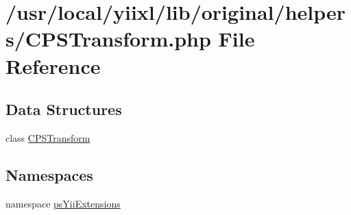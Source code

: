 \hypertarget{CPSTransform_8php}{
\section{/usr/local/yiixl/lib/original/helpers/CPSTransform.php File Reference}
\label{CPSTransform_8php}
}
\subsection*{Data Structures}
\begin{DoxyCompactItemize}
\item 
class \hyperlink{classCPSTransform}{CPSTransform}
\end{DoxyCompactItemize}
\subsection*{Namespaces}
\begin{DoxyCompactItemize}
\item 
namespace \hyperlink{namespacepsYiiExtensions}{psYiiExtensions}
\end{DoxyCompactItemize}
